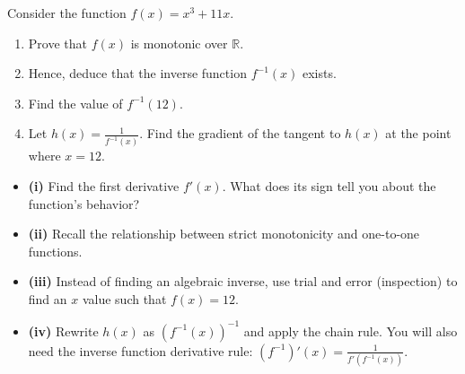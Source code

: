 
\begin{problem}
Consider the function $f(x) = x^3 + 11x$.
\begin{enumerate}
    \item[(i)] Prove that $f(x)$ is monotonic over $\mathbb{R}$.
    \item[(ii)] Hence, deduce that the inverse function $f^{-1}(x)$ exists.
    \item[(iii)] Find the value of $f^{-1}(12)$.
    \item[(iv)] Let $h(x) = \frac{1}{f^{-1}(x)}$. Find the gradient of the tangent to $h(x)$ at the point where $x = 12$.
\end{enumerate}
\end{problem}

\begin{hint}
\begin{itemize}[leftmargin=*]
    \item \textbf{(i)} Find the first derivative $f'(x)$. What does its sign tell you about the function's behavior?
    \item \textbf{(ii)} Recall the relationship between strict monotonicity and one-to-one functions.
    \item \textbf{(iii)} Instead of finding an algebraic inverse, use trial and error (inspection) to find an $x$ value such that $f(x) = 12$.
    \item \textbf{(iv)} Rewrite $h(x)$ as $(f^{-1}(x))^{-1}$ and apply the chain rule. You will also need the inverse function derivative rule: $(f^{-1})'(x) = \frac{1}{f'(f^{-1}(x))}$.
\end{itemize}
\end{hint}

